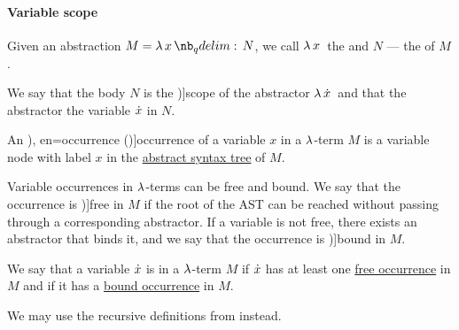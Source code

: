 \paragraph{Variable scope}

\begin{definition}\label{def:lambda_abstractor}
  Given an abstraction \( M = \qabs x N \), we call \( \qabs* x \) the  and \( N \) --- the  of \( M \).

  We say that the body \( N \) is the \term[ru=область действия (\cite[64]{Герасимов2011Вычислимость})]{scope} of the abstractor \( \quantifier* \synlambda \synx \) and that the abstractor  the variable \( {\dot{x}} \) in \( N \).
\end{definition}

\begin{definition}\label{def:lambda_variable_occurrence}\mimprovised
  An \term[ru=вхождение (\cite[64]{Герасимов2011Вычислимость}), en=occurrence (\cite[9A2]{Hindley1997STT})]{occurrence} of a variable \( x \) in a \( \mathrm{\lambda} \)-term \( M \) is a variable node with label \( x \) in the \hyperref[def:lambda_term_ast]{abstract syntax tree} of \( M \).

  Variable occurrences in \( \mathrm{\lambda} \)-terms can be free and bound. We say that the occurrence is \term[ru=свободное (вхождение) (\cite[64]{Герасимов2011Вычислимость})]{free} in \( M \) if the root of the AST can be reached without passing through a corresponding abstractor. If a variable is not free, there exists an abstractor that binds it, and we say that the occurrence is \term[ru=связанное (вхождение) (\cite[64]{Герасимов2011Вычислимость})]{bound} in \( M \).
\end{definition}

\begin{definition}\label{def:lambda_variable_freeness}
  We say that a variable \( {\dot{x}} \) is  in a \( \mathrm{\lambda} \)-term \( M \) if \( {\dot{x}} \) has at least one \hyperref[def:lambda_variable_occurrence]{free occurrence} in \( M \) and  if it has a \hyperref[def:lambda_variable_occurrence]{bound occurrence} in \( M \).
\end{definition}
\begin{comments}
  \item We may use the recursive definitions from  instead.
\end{comments}

